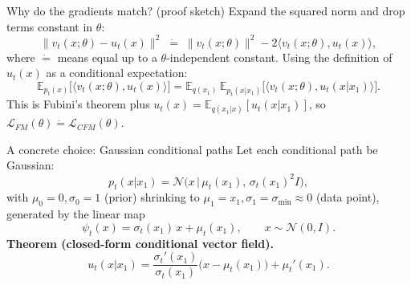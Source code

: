 \documentclass{beamer}
\begin{document}
\begin{frame}{Why do the gradients match? (proof sketch)}
Expand the squared norm and drop terms constant in $\theta$:
\[
\|v_t(x;\theta) - u_t(x)\|^2 \;\dot=\; \|v_t(x;\theta)\|^2 - 2\langle v_t(x;\theta), u_t(x)\rangle,
\]
where $\dot=$ means equal up to a $\theta$-independent constant. Using the definition of $u_t(x)$ as a conditional expectation:
\[
\mathbb{E}_{p_t(x)}\big[\langle v_t(x;\theta), u_t(x)\rangle\big]
= \mathbb{E}_{q(x_1)}\, \mathbb{E}_{p_t(x|x_1)}\big[\langle v_t(x;\theta), u_t(x|x_1)\rangle\big].
\]
This is Fubini's theorem plus $u_t(x) = \mathbb{E}_{q(x_1|x)}[u_t(x|x_1)]$, so $\mathcal{L}_{FM}(\theta) \dot= \mathcal{L}_{CFM}(\theta)$.
\end{frame}

\begin{frame}{A concrete choice: Gaussian conditional paths}
Let each conditional path be Gaussian:
\[
p_t(x|x_1) = \mathcal{N}\big(x \,\big|\, \mu_t(x_1),\, \sigma_t(x_1)^2 I\big),
\]
with $\mu_0=0,\sigma_0=1$ (prior) shrinking to $\mu_1=x_1,\sigma_1=\sigma_{\min}\approx 0$ (data point), generated by the linear map
\[
\psi_t(x) = \sigma_t(x_1)\, x + \mu_t(x_1), \qquad x \sim \mathcal{N}(0,I).
\]
\textbf{Theorem (closed-form conditional vector field).}
\[
u_t(x|x_1) = \frac{\sigma_t'(x_1)}{\sigma_t(x_1)}\big(x - \mu_t(x_1)\big) + \mu_t'(x_1).
\]
\begin{center}
\end{center}
\end{frame}
\end{document}
